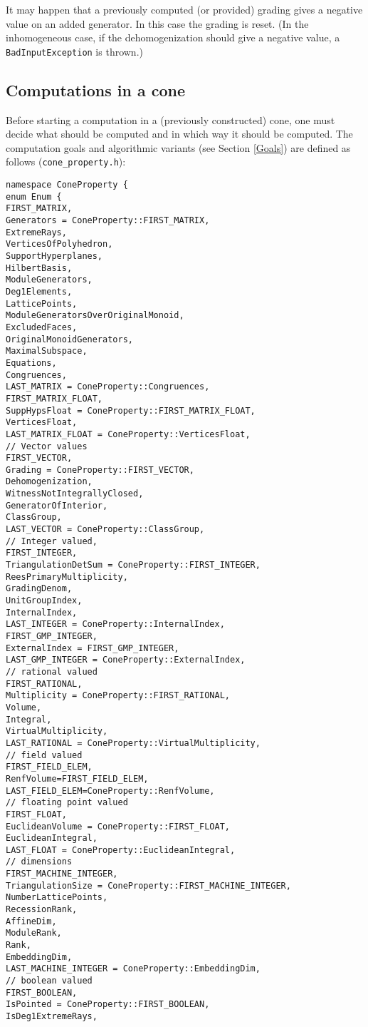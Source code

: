 \documentclass[12pt,a4paper]{scrartcl}
\theoremstyle{definition}
\begin{document}
\begin{small}
It may happen that a previously computed (or provided) grading gives a negative value on an added generator. In this case the grading is reset. (In the inhomogeneous case, if the dehomogenization should give a negative value, a \verb|BadInputException| is thrown.)
	
\subsection{Computations in a cone}

Before starting a computation in a (previously constructed) cone, one must decide what should be computed and in which way it should be computed. The computation goals and algorithmic variants (see Section \ref{Goals}) are defined as follows (\verb|cone_property.h|):
\begin{Verbatim}
namespace ConeProperty {
enum Enum {
FIRST_MATRIX,
Generators = ConeProperty::FIRST_MATRIX,
ExtremeRays,
VerticesOfPolyhedron,
SupportHyperplanes,
HilbertBasis,
ModuleGenerators,
Deg1Elements,
LatticePoints,
ModuleGeneratorsOverOriginalMonoid,
ExcludedFaces,
OriginalMonoidGenerators,
MaximalSubspace,
Equations,
Congruences,
LAST_MATRIX = ConeProperty::Congruences,
FIRST_MATRIX_FLOAT,
SuppHypsFloat = ConeProperty::FIRST_MATRIX_FLOAT,
VerticesFloat,
LAST_MATRIX_FLOAT = ConeProperty::VerticesFloat,
// Vector values
FIRST_VECTOR,
Grading = ConeProperty::FIRST_VECTOR,
Dehomogenization,
WitnessNotIntegrallyClosed,
GeneratorOfInterior,
ClassGroup,
LAST_VECTOR = ConeProperty::ClassGroup,
// Integer valued,
FIRST_INTEGER,
TriangulationDetSum = ConeProperty::FIRST_INTEGER,
ReesPrimaryMultiplicity,
GradingDenom,
UnitGroupIndex,
InternalIndex,
LAST_INTEGER = ConeProperty::InternalIndex,
FIRST_GMP_INTEGER,
ExternalIndex = FIRST_GMP_INTEGER,
LAST_GMP_INTEGER = ConeProperty::ExternalIndex,
// rational valued
FIRST_RATIONAL,
Multiplicity = ConeProperty::FIRST_RATIONAL,
Volume,
Integral,
VirtualMultiplicity,
LAST_RATIONAL = ConeProperty::VirtualMultiplicity,
// field valued
FIRST_FIELD_ELEM,
RenfVolume=FIRST_FIELD_ELEM,
LAST_FIELD_ELEM=ConeProperty::RenfVolume,
// floating point valued
FIRST_FLOAT,
EuclideanVolume = ConeProperty::FIRST_FLOAT,
EuclideanIntegral,
LAST_FLOAT = ConeProperty::EuclideanIntegral,
// dimensions
FIRST_MACHINE_INTEGER,
TriangulationSize = ConeProperty::FIRST_MACHINE_INTEGER,
NumberLatticePoints,
RecessionRank,
AffineDim,
ModuleRank,
Rank,
EmbeddingDim,
LAST_MACHINE_INTEGER = ConeProperty::EmbeddingDim,
// boolean valued 
FIRST_BOOLEAN,
IsPointed = ConeProperty::FIRST_BOOLEAN,
IsDeg1ExtremeRays,

\end{Verbatim}
\end{small}
\end{document}
